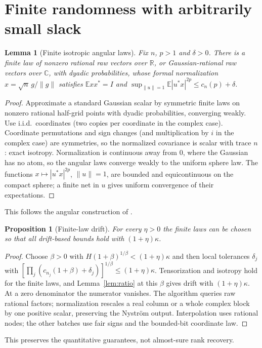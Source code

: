 \documentclass[11pt,a4paper]{article}
\newtheorem{lemma}[theorem]{Lemma}
\newtheorem{proposition}[theorem]{Proposition}
\theoremstyle{definition}\newtheorem{definition}[theorem]{Definition}
\theoremstyle{remark}\newtheorem{remark}[theorem]{Remark}
\numberwithin{equation}{section}
\newcommand{\E}{\mathbb E}
\newcommand{\R}{\mathbb R}
\newcommand{\C}{\mathbb C}
\newcommand{\norm}[1]{\lVert#1\rVert}
\begin{document}
\section{Finite randomness with arbitrarily small slack}\label{app:finite}
\begin{lemma}[Finite isotropic angular laws]\label{lem:finite}
Fix $n$, $p>1$ and $\delta>0$. There is a finite law of nonzero rational raw
vectors over $\R$, or Gaussian-rational raw vectors over $\C$, with dyadic
probabilities, whose formal normalization $x=\sqrt n\,g/\norm g$ satisfies
$\E xx^*=I$ and $\sup_{\norm u=1}\E|u^*x|^{2p}\le c_n(p)+\delta$.
\end{lemma}
\begin{proof}
Approximate a standard Gaussian scalar by symmetric finite laws on nonzero
rational half-grid points with dyadic probabilities, converging weakly. Use
i.i.d.\ coordinates (two copies per coordinate in the complex case). Coordinate
permutations and sign changes (and multiplication by $i$ in the complex case)
are symmetries, so the normalized covariance is scalar with trace $n$: exact
isotropy. Normalization is continuous away from $0$, where the Gaussian has no
atom, so the angular laws converge weakly to the uniform sphere law. The
functions $x\mapsto|u^*x|^{2p}$, $\norm u=1$, are bounded and equicontinuous on
the compact sphere; a finite net in $u$ gives uniform convergence of their
expectations.
\end{proof}
This follows the angular construction of \cite[Section~6]{Holden}.

\begin{proposition}[Finite-law drift]\label{prop:finite}
For every $\eta>0$ the finite laws can be chosen so that all drift-based bounds
hold with $(1+\eta)\kappa$.
\end{proposition}
\begin{proof}
Choose $\beta>0$ with $H(1+\beta)^{1/\beta}<(1+\eta)\kappa$ and then local tolerances
$\delta_j$ with $[\prod_j(c_{n_j}(1+\beta)+\delta_j)]^{1/\beta}\le(1+\eta)\kappa$.
Tensorization and isotropy hold for the finite laws, and Lemma~\ref{lem:ratio}
at this $\beta$ gives drift with $(1+\eta)\kappa$. At a zero denominator the
numerator vanishes. The algorithm queries raw rational factors; normalization
rescales a real column or a whole complex block by one positive scalar,
preserving the Nystr\"om output. Interpolation uses rational nodes; the other
batches use fair signs and the bounded-bit coordinate law.
\end{proof}
This preserves the quantitative guarantees, not almost-sure rank recovery.
\end{document}

